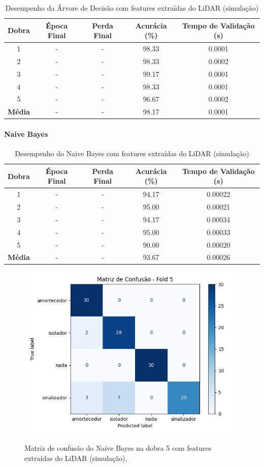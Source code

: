 \begin{table}[H]
\centering
\caption{Desempenho da Árvore de Decisão com features extraídas do LiDAR (simulação)}
\label{tab:arvore_features_lidar_simulado}
\begin{tabular}{ccccc}
\hline
\textbf{Dobra} & \textbf{Época Final} & \textbf{Perda Final} & \textbf{Acurácia (\%)} & \textbf{Tempo de Validação (s)} \\
\hline
1 & - & - & 98.33 & 0.0001 \\
2 & - & - & 98.33 & 0.0002 \\
3 & - & - & 99.17 & 0.0001 \\
4 & - & - & 98.33 & 0.0001 \\
5 & - & - & 96.67 & 0.0002 \\
\hline
\textbf{Média} & - & - & 98.17 & 0.0001 \\
\hline
\end{tabular} \fonte{}
\end{table}

\paragraph{Naive Bayes}

\begin{table}[H]
\centering
\caption{Desempenho do Naive Bayes com features extraídas do LiDAR (simulação)}
\label{tab:naive_features_lidar_simulado}
\begin{tabular}{ccccc}
\hline
\textbf{Dobra} & \textbf{Época Final} & \textbf{Perda Final} & \textbf{Acurácia (\%)} & \textbf{Tempo de Validação (s)} \\
\hline
1 & - & - & 94.17 & 0.00022 \\
2 & - & - & 95.00 & 0.00021 \\
3 & - & - & 94.17 & 0.00034 \\
4 & - & - & 95.00 & 0.00033 \\
5 & - & - & 90.00 & 0.00020 \\
\hline
\textbf{Média} & - & - & 93.67 & 0.00026 \\
\hline
\end{tabular} \fonte{}
\end{table}

\begin{figure}[H]
\caption{Matriz de confusão do Naive Bayes na dobra 5 com features extraídas do LiDAR (simulação).}
\includegraphics[width=0.7\linewidth]{figuras/Resultados/simu_principal_Teste4_naive.png}
\fonte{}
\label{fig:matriz_confusao_naive_lidar_features}
\end{figure}

